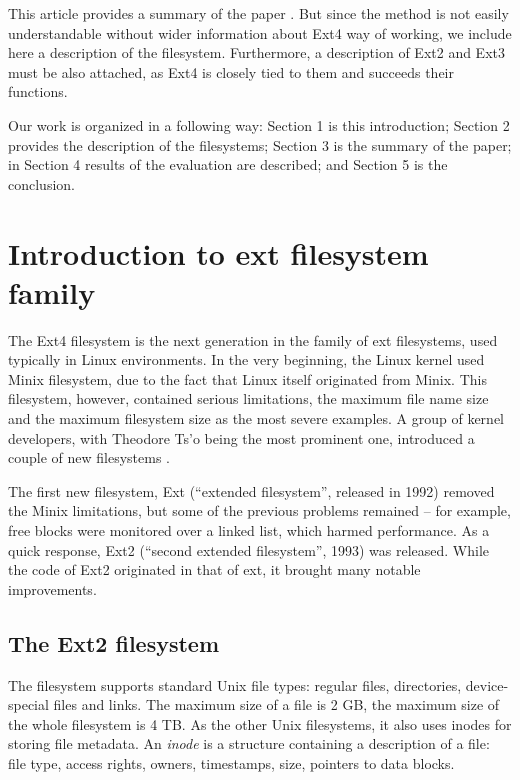 \documentclass{acm_proc_article-sp}
\begin{document}
This article provides a summary of the paper \cite{afeic}. But since the method is not easily understandable without wider information about Ext4 way of working, we include here a description of the filesystem. Furthermore, a description of Ext2 and Ext3 must be also attached, as Ext4 is closely tied to them and succeeds their functions.

Our work is organized in a following way: Section 1 is this introduction; Section 2 provides the description of the filesystems; Section 3 is the summary of the paper; in Section 4 results of the evaluation are described; and Section 5 is the conclusion.

\section{Introduction to ext filesystem family}

The Ext4 filesystem is the next generation in the family of ext filesystems, used typically in Linux environments. In the very beginning, the Linux kernel used Minix filesystem, due to the fact that Linux itself originated from Minix. This filesystem, however, contained serious limitations, the maximum file name size and the maximum filesystem size as the most severe examples. A group of kernel developers, with Theodore Ts'o being the most prominent one, introduced a couple of new filesystems \cite{ext2design}.

The first new filesystem, Ext (``extended filesystem'', released in 1992) removed the Minix limitations, but some of the previous problems remained -- for example, free blocks were monitored over a linked list, which harmed performance. As a quick response, Ext2 (``second extended filesystem'', 1993) was released. While the code of Ext2 originated in that of ext, it brought many notable improvements.

\subsection{The Ext2 filesystem}

The filesystem supports standard Unix file types: regular files, directories, device-special files and links. The maximum size of a file is 2 GB, the maximum size of the whole filesystem is 4 TB.
As the other Unix filesystems, it also uses inodes for storing file metadata. An {\it inode} is a structure containing a description of a file: file type, access rights, owners, timestamps, size, pointers to data blocks.
\end{document}
